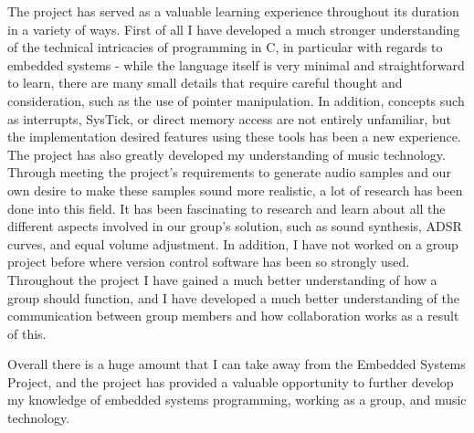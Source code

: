The project has served as a valuable learning experience throughout its duration
in a variety of ways. 
First of all I have developed a much stronger understanding of the technical 
intricacies of programming in C, in particular with regards to embedded systems 
- while the language itself is very minimal and 
straightforward to learn, there are many small details that require careful 
thought and consideration, such as the use of pointer manipulation. 
In addition, concepts such as interrupts, SysTick, or direct memory access are 
not entirely unfamiliar, but the implementation desired features using 
these tools has been a new experience.
The project has also greatly developed my understanding of music technology. 
Through meeting the project's requirements to generate audio samples and our own 
desire to make these samples sound more realistic, a lot of research has been done 
into this field. It has been fascinating to research and 
learn about all the different aspects involved in our group's solution, such as 
sound synthesis, ADSR curves, and equal volume adjustment. 
In addition, I have not worked on a group project before where version control 
software has been so strongly used. Throughout the project I have gained a much 
better understanding of how a group should function, and I have developed a much 
better understanding of the communication between group members and how 
collaboration works as a result of this.  
\par\bigskip\noindent
Overall there is a huge amount that I can take away from the Embedded Systems 
Project, and the project has provided a valuable opportunity to further develop 
my knowledge of embedded systems programming, working as a group, and music 
technology. 
